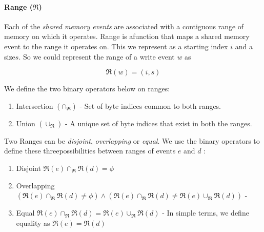         
    \paragraph{Range ($\Re$)}
        Each of the \textit{shared memory events} are associated with a contiguous range of memory on which it operates. Range is afunction that maps a shared memory event to the range it operates on. This we represent as a starting index $i$ and a size$s$. So we could represent the range of a write event $w$ as 
                
                \[\Re(w) = (i, s) \]
    
        
        We define the two binary operators below on ranges: 
        \begin{enumerate}
            \item Intersection $(\cap{_\Re})$ - Set of byte indices common to both ranges.
            \item Union $(\cup_\Re)$ - A unique set of byte indices that exist in both the ranges.  
        \end{enumerate}
        
        Two Ranges can be \textit{disjoint}, \textit{overlapping} or \textit{equal}. We use the binary operators to define these threepossibilities between ranges of events $e$ and $d$ :
        \begin{enumerate}
            \item Disjoint $\Re(e) \cap_\Re \Re(d) = \phi$ 
            \item Overlapping $(\Re(e)\cap_\Re \Re(d) \neq \phi) \wedge (\Re(e) \cap_\Re  \Re(d) \neq \Re(e) \cup_\Re \Re(d))$ - 
            \item Equal $\Re(e) \cap_\Re  \Re(d) = \Re(e) \cup_\Re \Re(d)$ - In simple terms, we define equality as $\Re(e) = \Re(d)$
        \end{enumerate}
        
            
